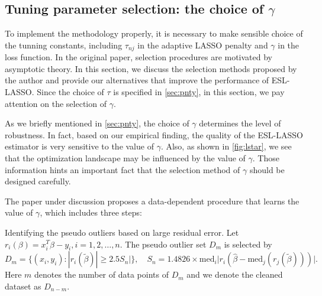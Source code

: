 \subsection{Tuning parameter selection: the choice of $\gamma$}

To implement the methodology properly, it is
necessary to make sensible choice of the tunning constants, including $\tau_{nj}$ in the adaptive LASSO penalty and
$\gamma$ in the loss function. In the original paper, selection procedures are motivated by asymptotic theory. In
this section, we discuss the selection methods proposed by the author and provide our alternatives that improve the
performance of ESL-LASSO. Since the choice of $\tau$ is specified in \cref{sec:pnty}, in this section, we pay
attention on the selection of $\gamma$.

As we briefly mentioned in \cref{sec:pnty}, the choice of $\gamma$ determines the level of robustness. In fact, based on our empirical finding, the quality of the ESL-LASSO estimator is very sensitive to the value of $\gamma$. Also, as shown in \cref{fig:lstar}, we see that the optimization landscape may be influenced by the value of $\gamma$. Those information hints an important fact that the selection method of $\gamma$ should be designed carefully. 



The paper under discussion proposes a data-dependent procedure that  learns the value of $\gamma$, which includes three steps:
\benum
\item[Step 1: ] Identifying the pseudo outliers based on large residual error. Let $r_i(\beta) = x_i^T \beta - y_i, i = 1, 2, \dots, n $. The pseudo outlier set $D_m$ is selected by
\[\label{eq:pseudo_outlier}
D_m = \{(x_i, y_i): |r_i(\tilde\beta )| \geq 2.5 S_n| \}, \quad S_n = 1.4826 \times \text{med}_i | r_i(\hat \beta - \text{med}_j(r_j(\tilde \beta))   )| .
\]  
Here $m$ denotes the number of data points of $D_m$ and we denote the cleaned dataset as $D_{n-m}$.

